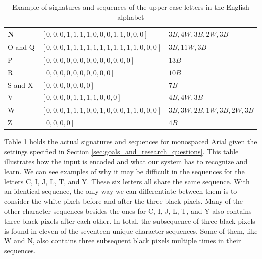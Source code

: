 \begin{table}[ht]
\begin{tabular}{|l|l|l|}
        N                     & \([0, 0, 0, 1, 1, 1, 1, 0, 0, 0, 1, 1, 0, 0, 0]\)       & \(3B, 4W, 3B, 2W, 3B\)         \\ \hline
        O and Q               & \([0, 0, 0, 1, 1, 1, 1, 1, 1, 1, 1, 1, 1, 1, 0, 0, 0]\) & \(3B, 11W, 3B\)                \\ \hline
        P                     & \([0, 0, 0, 0, 0, 0, 0, 0, 0, 0, 0, 0, 0]\)             & \(13B\)                        \\ \hline
        R                     & \([0, 0, 0, 0, 0, 0, 0, 0, 0, 0]\)                      & \(10B\)                        \\ \hline
        S and X               & \([0, 0, 0, 0, 0, 0, 0]\)                               & \(7B\)                         \\ \hline
        V                     & \([0, 0, 0, 0, 1, 1, 1, 1, 0, 0, 0]\)                   & \(4B, 4W, 3B\)                 \\ \hline
        W                     & \([0, 0, 0, 1, 1, 1, 0, 0, 1, 0, 0, 0, 1, 1, 0, 0, 0]\) & \(3B, 3W, 2B, 1W, 3B, 2W, 3B\) \\ \hline
        Z                     & \([0, 0, 0, 0]\)                                        & \(4B\)                         \\ \hline
    \end{tabular}
    \captionsetup{justification=centering}
    \caption{Example of signatures and sequences of the upper-case letters in the English alphabet}
    \label{table:signature_sequence_example}
\end{table}

Table \ref{table:signature_sequence_example} holds the actual signatures and sequences for monospaced Arial given the settings specified in Section \ref{sec:goals_and_research_questions}. This table illustrates how the input is encoded and what our system has to recognize and learn. We can see examples of why it may be difficult in the sequences for the letters C, I, J, L, T, and Y. These six letters all share the same sequence. With an identical sequence, the only way we can differentiate between them is to consider the white pixels before and after the three black pixels. Many of the other character sequences besides the ones for C, I, J, L, T, and Y also contains three black pixels after each other. In total, the subsequence of three black pixels is found in eleven of the seventeen unique character sequences. Some of them, like W and N, also contains three subsequent black pixels multiple times in their sequences. 

